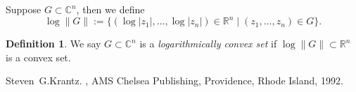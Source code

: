 \documentclass[12pt]{article}
\theoremstyle{theorem}
\theoremstyle{definition}
\newtheorem*{defn}{Definition}
\begin{document}
Suppose $G \subset {\mathbb{C}}^n$, then
we define
\begin{equation*}
\log \lVert G \rVert :=
 \{ (\log \lvert z_1 \rvert ,\ldots,
 \log \lvert z_n \rvert) \in {\mathbb{R}}^n
\mid
 (z_1,\ldots,z_n) \in G \} .
\end{equation*}

\begin{defn}
We say $G \subset {\mathbb{C}}^n$ is a {\em logarithmically convex set}
if $\log \lVert G \rVert \subset {\mathbb{R}}^n$ is a convex set.
\end{defn}

\begin{thebibliography}{9}
Steven~G.\@ Krantz.
{\em {}},
AMS Chelsea Publishing, Providence, Rhode Island, 1992.
\end{thebibliography}
\end{document}
